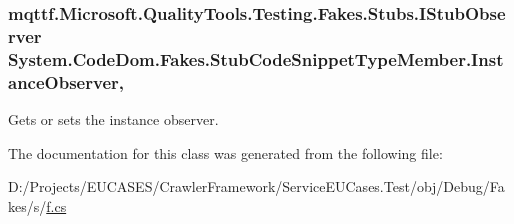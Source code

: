 \hypertarget{class_system_1_1_code_dom_1_1_fakes_1_1_stub_code_snippet_type_member_a734291bb2a9da2a9c535dfe8c261d089}{
\subsubsection[{Instance\-Observer}]{\setlength{\rightskip}{0pt plus 5cm}mqttf.\-Microsoft.\-Quality\-Tools.\-Testing.\-Fakes.\-Stubs.\-I\-Stub\-Observer System.\-Code\-Dom.\-Fakes.\-Stub\-Code\-Snippet\-Type\-Member.\-Instance\-Observer\hspace{0.3cm}{\ttfamily [get]}, {\ttfamily [set]}}}\label{class_system_1_1_code_dom_1_1_fakes_1_1_stub_code_snippet_type_member_a734291bb2a9da2a9c535dfe8c261d089}


Gets or sets the instance observer.



The documentation for this class was generated from the following file\-:\begin{DoxyCompactItemize}
\item 
D\-:/\-Projects/\-E\-U\-C\-A\-S\-E\-S/\-Crawler\-Framework/\-Service\-E\-U\-Cases.\-Test/obj/\-Debug/\-Fakes/s/\hyperlink{s_2f_8cs}{f.\-cs}\end{DoxyCompactItemize}

